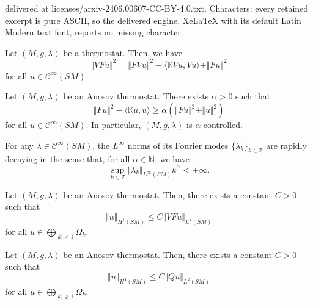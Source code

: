 \documentclass[10pt,a4paper]{amsart}
\newcommand{\N}{\mathbb{N}}
\newcommand{\Z}{\mathbb{Z}}
\begin{document}
delivered at licenses/arxiv-2406.00607-CC-BY-4.0.txt. Characters: every retained excerpt is pure ASCII, so the delivered engine, XeLaTeX with its default Latin Modern text font, reports no missing character.
\begin{theorem}
Let $(M, g, \lambda)$ be a thermostat. Then, we have
\begin{equation}\label{eq:pestov-identity}
\Vert VF u\Vert^2=\Vert FVu\Vert^2-\langle \mathbb{K} Vu, Vu\rangle+\Vert Fu\Vert^2
\end{equation}
for all $u\in \mathcal{C}^\infty(SM)$.
\end{theorem}

\begin{theorem}\label{theorem:alpha-regularity}
Let $(M, g, \lambda)$ be an Anosov thermostat. There exists $\alpha>0$ such that
\begin{equation*}
\Vert F u \Vert^2-\langle\mathbb{K} u, u\rangle\geq \alpha\left(\Vert Fu\Vert^2+\Vert u \Vert^2\right)
\end{equation*}
for all $u \in \mathcal{C}^\infty(SM)$. In particular, $(M, g,\lambda)$ is $\alpha$-controlled.  
\end{theorem}

\begin{lemma}\label{lemma:rapid-decay}
For any $\lambda\in \mathcal{C}^\infty(SM)$, 
the $L^\infty$ norms of its Fourier modes $\{\lambda_k\}_{k\in \Z}$ are rapidly decaying in the sense that, for all $\alpha\in \N$, we have
\begin{equation*}
\sup_{k\in \Z}  \Vert \lambda_{k}\Vert_{L^\infty(SM)}k^\alpha<+\infty.
\end{equation*}
\end{lemma}

\begin{lemma}\label{lemma:hanming-lemma}
Let $(M, g, \lambda)$ be an Anosov thermostat. Then, there exists a constant $C>0$ such that
$$\Vert u \Vert_{H^1(SM)}\leq C\Vert VFu\Vert_{L^2(SM)}$$
for all $u\in \bigoplus_{|k|\geq 1}\Omega_k$.
\end{lemma}

\begin{lemma}
Let $(M, g, \lambda)$ be an Anosov thermostat. Then, there exists a constant $C>0$ such that 
\begin{equation*}
\Vert u \Vert_{H^1(SM)}\leq C\Vert Qu \Vert_{L^2(SM)}
\end{equation*}
for all $u\in \bigoplus_{|k|\geq 1}\Omega_k$. 
\end{lemma}
\end{document}
